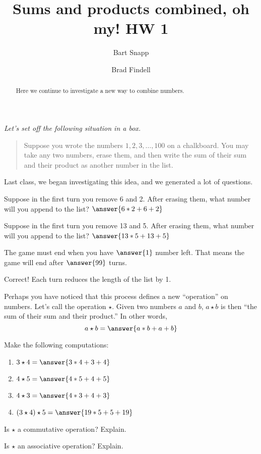 \documentclass{ximera}
\title{Sums and products combined, oh my!  HW 1}
\author{Bart Snapp \and Brad Findell}
\begin{document}
\begin{abstract}
Here we continue to investigate a new way to combine numbers.
\end{abstract}
\maketitle

\emph{Let's set off the following situation in a box.} 
\begin{quote}
Suppose you wrote the numbers $1,2,3,\dots,100$ on a chalkboard. You
may take any two numbers, erase them, and then write the sum of their
sum and their product as another number in the list.
\end{quote}
Last class, we began investigating this idea, and we generated a lot
of questions.  

\begin{problem}
Suppose in the first turn you remove 6 and 2.  After erasing them, what number will you append to the list?  $\answer{6*2+6+2}$
\end{problem}

\begin{problem}
Suppose in the first turn you remove 13 and 5.  After erasing them, what number will you append to the list?  $\answer{13*5+13+5}$
\end{problem}

\begin{problem}
The game must end when you have $\answer{1}$ number left.  That means the game will end after $\answer{99}$ turns.
\begin{feedback}[correct]
Correct!  Each turn reduces the length of the list by 1.
\end{feedback}
\end{problem}

\begin{problem}
Perhaps you have noticed that this process defines a new ``operation'' on numbers.  Let's
call the operation $\star$.  Given two numbers $a$ and $b$, $a\star b$
is then ``the sum of their sum and their product.''  In other words, 
\[
a\star b = \answer{a*b+a+b}
\]
\end{problem}

\begin{problem}
Make the following computations:
\begin{enumerate}
\item $3\star 4= \answer{3*4+3+4}$
\item $4\star 5= \answer{4*5+4+5}$
\item $4\star 3= \answer{4*3+4+3}$
\item $(3\star 4)\star 5 = \answer{19*5+5+19}$
\end{enumerate}
\end{problem}


\begin{problem}
Is $\star$ a commutative operation?  Explain.  
\begin{freeResponse}
\end{freeResponse}
\end{problem}


\begin{problem}
Is $\star$ an associative operation?  Explain.  
\begin{freeResponse}
\end{freeResponse}
\end{problem}
\end{document}
